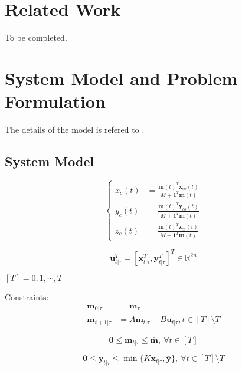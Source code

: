 \documentclass[english]{cccconf}
\begin{document}
\section{Related Work}
To be completed.



\section{System Model and Problem Formulation}
The details of the model is refered to \cite{miao2021optimal}.

\subsection{System Model}

\begin{equation}\label{aircraft cg constraint}
\left\{
\begin{aligned}
x_c(t) &= \frac{\textbf{m}(t)^T\textbf{x}_{co}(t)}{M+\textbf{1}^T\textbf{m}(t)}\\
y_c(t) &= \frac{\textbf{m}(t)^T\textbf{y}_{co}(t)}{M+\textbf{1}^T\textbf{m}(t)}\\
z_c(t) &= \frac{\textbf{m}(t)^T\textbf{z}_{co}(t)}{M+\textbf{1}^T\textbf{m}(t)}
\end{aligned}
\right.
\end{equation}

\begin{equation}
  \mathbf{u}_{t|\tau}^T = \left[\mathbf{x}_{t|\tau}^T, \mathbf{y}_{t|\tau}^T\right]^T \in \mathbb{R}^{2n}
\end{equation}

$[T] = {0, 1, \cdots, T}$

Constraints:
\begin{equation}\label{eq:fuel_weight_dynamics}
\begin{aligned}
\textbf{m}_{0|\tau} &= \textbf{m}_{\tau}\\
\textbf{m}_{t+1|\tau} &= A\textbf{m}_{t|\tau}+ B\textbf{u}_{t|\tau}, t \in [T]\setminus T
\end{aligned}
\end{equation}

\begin{equation}\label{eq:weight_bound_constraint}
\mathbf{0} \leq \mathbf{m}_{t|\tau} \leq \bar{\mathbf{m}}, ~\forall t \in [T]
\end{equation}

\begin{equation}\label{eq:feed_bound_constraint}
  \mathbf{0} \leq \mathbf{y}_{t|\tau} \leq \min \{K\mathbf{x}_{t|\tau},\bar{\textbf{y}}\}, ~\forall t \in [T]\setminus T
\end{equation}
\end{document}
